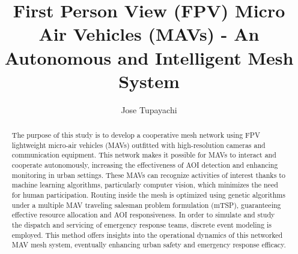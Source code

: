 \documentclass[preprint,review, 11pt,3p,authoryear]{elsarticle}
\begin{document}
\begin{frontmatter}
\title{First Person View (FPV) Micro Air Vehicles (MAVs) - An Autonomous and Intelligent Mesh System }







\author[mymainaddress]{Jose Tupayachi}


\address[mymainaddress]{Department of Industrial and Systems Engineering, The University of Tennessee at Knoxville, Knoxville, TN 37996, US}


\doublespacing

\begin{abstract}
The purpose of this study is to develop a cooperative mesh network using FPV lightweight micro-air vehicles (MAVs) outfitted with high-resolution cameras and communication equipment. This network makes it possible for MAVs to interact and cooperate autonomously, increasing the effectiveness of AOI detection and enhancing monitoring in urban settings. These MAVs can recognize activities of interest thanks to machine learning algorithms, particularly computer vision, which minimizes the need for human participation. Routing inside the mesh is optimized using genetic algorithms under a multiple MAV traveling salesman problem formulation (mTSP), guaranteeing effective resource allocation and AOI responsiveness. In order to simulate and study the dispatch and servicing of emergency response teams, discrete event modeling is employed. This method offers insights into the operational dynamics of this networked MAV mesh system, eventually enhancing urban safety and emergency response efficacy.


\end{abstract}
\end{frontmatter}
\end{document}
